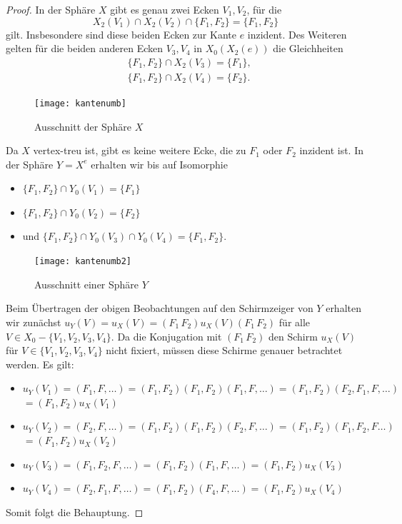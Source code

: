 \documentclass[12pt,titlepage,twoside,cleardoublepage]{article}
\theoremstyle{nummermitklammern}
\numberwithin{equation}{section}
\begin{document}
\begin{proof}
In der Sphäre $X$ gibt es genau zwei Ecken $V_1,V_2$, für die 
\[
X_2(V_1)\cap X_2(V_2)\cap \{F_1,F_2\}=\{F_1,F_2\}
\] 
gilt. Insbesondere sind diese beiden Ecken zur Kante $e$  inzident. Des Weiteren gelten für die beiden anderen Ecken $V_3,V_4$ in $X_0(X_2(e))$ die Gleichheiten 
\begin{align*}
&\{F_1,F_2\} \cap X_2(V_3)=\{F_1\},\\
&\{F_1,F_2\} \cap X_2(V_4)=\{F_2\}.
\end{align*}  
\begin{figure}[H]
\begin{center}
\texttt{[image: kantenumb]}
\end{center}
\caption{Ausschnitt der Sphäre $X$}
\end{figure}
Da $X$ vertex-treu ist, gibt es keine weitere Ecke, die zu $F_1$ oder $F_2$ inzident ist.
In der Sphäre $Y=X^e$ erhalten wir bis auf Isomorphie  
\begin{itemize}
\item $\{F_1,F_2\} \cap Y_0(V_1)=\{F_1\}$ 
\item $\{F_1,F_2\} \cap Y_0(V_2)=\{F_2\}$
\item und $\{F_1,F_2\} \cap Y_0(V_3)\cap Y_0(V_4)=\{F_1,F_2\}$.
\end{itemize}
\begin{figure}[H]
\begin{center}
\texttt{[image: kantenumb2]}
\end{center}
\caption{Ausschnitt einer Sphäre $Y$}
\end{figure}
Beim Übertragen der obigen Beobachtungen auf den Schirmzeiger von $Y$ erhalten wir zunächst $u_Y(V)=u_X(V)=(F_1\,F_2)u_X(V) (F_1\,F_2)$
für alle $V\in X_0-\{V_1,V_2,V_3,V_4\}.$
Da die Konjugation mit $(F_1\,F_2)$ den Schirm $u_X(V)$ für $V\in \{V_1,V_2,V_3,V_4\}$ nicht fixiert, müssen diese Schirme genauer betrachtet werden. 
Es gilt:
\begin{itemize} 
\item $u_{Y}(V_1)=(F_1,F,\ldots)=(F_1,F_2)(F_1,F_2)(F_1,F,\ldots)=(F_1,F_2)(F_2,F_1,F,\ldots)$ \\$=(F_1,F_2)u_X(V_1)$
\item $u_{Y}(V_2)=(F_2,F,\ldots)=(F_1,F_2)(F_1,F_2)(F_2,F,\ldots)=(F_1,F_2)(F_1,F_2,F\ldots)$\\$=(F_1,F_2)u_X(V_2)$
\item $u_{Y}(V_3)=(F_1,F_2,F,\ldots)=(F_1,F_2)(F_1,F,\ldots)=(F_1,F_2)u_X(V_3)$
\item $u_{Y}(V_4)=(F_2,F_1,F,\ldots)=(F_1,F_2)(F_4,F,\ldots)=(F_1,F_2)u_X(V_4)$
\end{itemize}
Somit folgt die Behauptung.
\end{proof}
\end{document}
